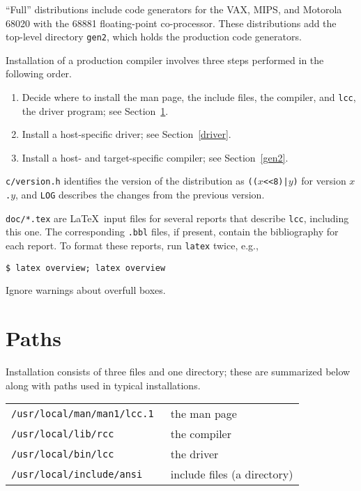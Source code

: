``Full'' distributions include code generators for the VAX, MIPS,
and Motorola 68020 with the 68881 floating-point co-processor.
These distributions add the top-level directory
\verb|gen2|, which holds the production code generators.

Installation of a production compiler
involves three steps performed in the following order.
\begin{enumerate}
\item Decide where to install the man page, the include files,
the compiler, and \verb|lcc|, the driver program; see Section~\ref{paths}.

\item Install a host-specific driver; see Section~\ref{driver}.

\item Install a host- and target-specific compiler; see Section~\ref{gen2}.
\end{enumerate}

\verb|c/version.h| identifies the version of the distribution
as {\tt (($x$<<8)|$y$)} for version {\tt $x$.$y$},
and \verb|LOG| describes the changes from the previous version.

\verb|doc/*.tex| are \LaTeX\ input files for several reports that
describe \verb|lcc|, including this one.
The corresponding \verb|.bbl| files, if present,
contain the bibliography for each report. To format these reports,
run \verb|latex| twice, e.g.,
\begin{verbatim}
$ latex overview; latex overview
\end{verbatim}
Ignore warnings about overfull boxes.

\section{Paths}\label{paths}

Installation consists of three files and one directory;
these are summarized below along with paths used in typical installations.

\begin{center}
\begin{tabular}{ll}
\tt /usr/local/man/man1/lcc.1	& the man page \\
\tt /usr/local/lib/rcc		& the compiler \\
\tt /usr/local/bin/lcc		& the driver \\
\tt /usr/local/include/ansi	& include files (a directory) \\
\end{tabular}
\end{center}

